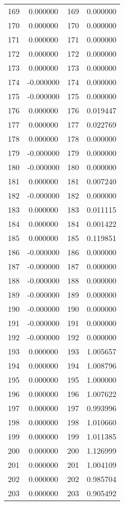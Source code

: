 \documentclass[12pt]{article}
\begin{document}
\begin{longtable}{@{}cccc@{}}
169 & 0.000000 & 169 & 0.000000 \\
170 & 0.000000 & 170 & 0.000000 \\
171 & 0.000000 & 171 & 0.000000 \\
172 & 0.000000 & 172 & 0.000000 \\
173 & 0.000000 & 173 & 0.000000 \\
174 & -0.000000 & 174 & 0.000000 \\
175 & -0.000000 & 175 & 0.000000 \\
176 & 0.000000 & 176 & 0.019447 \\
177 & 0.000000 & 177 & 0.022769 \\
178 & 0.000000 & 178 & 0.000000 \\
179 & -0.000000 & 179 & 0.000000 \\
180 & -0.000000 & 180 & 0.000000 \\
181 & 0.000000 & 181 & 0.007240 \\
182 & -0.000000 & 182 & 0.000000 \\
183 & 0.000000 & 183 & 0.011115 \\
184 & 0.000000 & 184 & 0.001422 \\
185 & 0.000000 & 185 & 0.119851 \\
186 & -0.000000 & 186 & 0.000000 \\
187 & -0.000000 & 187 & 0.000000 \\
188 & -0.000000 & 188 & 0.000000 \\
189 & -0.000000 & 189 & 0.000000 \\
190 & -0.000000 & 190 & 0.000000 \\
191 & -0.000000 & 191 & 0.000000 \\
192 & -0.000000 & 192 & 0.000000 \\
193 & 0.000000 & 193 & 1.005657 \\
194 & 0.000000 & 194 & 1.008796 \\
195 & 0.000000 & 195 & 1.000000 \\
196 & 0.000000 & 196 & 1.007622 \\
197 & 0.000000 & 197 & 0.993996 \\
198 & 0.000000 & 198 & 1.010660 \\
199 & 0.000000 & 199 & 1.011385 \\
200 & 0.000000 & 200 & 1.126999 \\
201 & 0.000000 & 201 & 1.004109 \\
202 & 0.000000 & 202 & 0.985704 \\
203 & 0.000000 & 203 & 0.905492 \\

\end{longtable}
\end{document}

